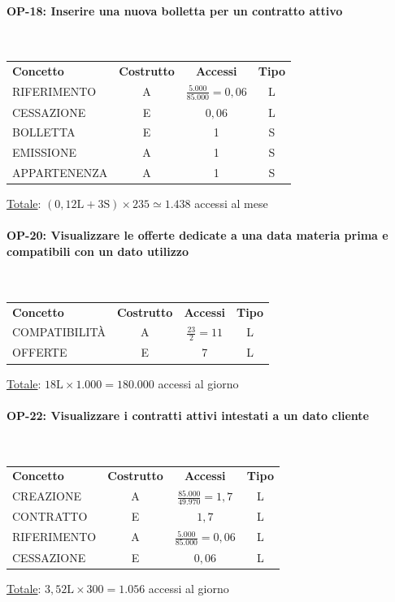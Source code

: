 \documentclass[a4paper,12pt]{report}
\begin{document}
\paragraph{OP-18: Inserire una nuova bolletta per un contratto attivo}\mbox{}\\
\begin{center}
\begin{tabular}{@{}l c  c  c@{}}
    \hline
    \textbf{Concetto} & \textbf{Costrutto} & \textbf{Accessi} & \textbf{Tipo} \\ [0.5ex]
    RIFERIMENTO & A & $\frac{5.000}{85.000} = 0,06$ & L \\
    CESSAZIONE & E & $0,06$ & L \\
    BOLLETTA & E & 1 & S \\
    EMISSIONE & A & 1 & S \\
    APPARTENENZA & A & 1 & S \\
    \hline
\end{tabular}
\end{center}
\underline{Totale}: $(0,12\text{L} + 3\text{S}) \times 235 \simeq 1.438$ accessi al mese
\paragraph{OP-20: Visualizzare le offerte dedicate a una data materia prima e compatibili con un dato utilizzo}\mbox{}\\
    \begin{center}
    \begin{tabular}{@{}l c  c  c@{}}
        \hline
        \textbf{Concetto} & \textbf{Costrutto} & \textbf{Accessi} & \textbf{Tipo} \\ [0.5ex]
        COMPATIBILITÀ & A & $\frac{23}{2} = 11$ & L \\
        OFFERTE & E & 7 & L \\
        \hline
    \end{tabular}
    \end{center}
    \underline{Totale}: $18\text{L} \times 1.000 = 180.000$ accessi al giorno
\paragraph{OP-22: Visualizzare i contratti attivi intestati a un dato cliente}\mbox{}\\
\begin{center}
\begin{tabular}{@{}l c  c  c@{}}
    \hline
    \textbf{Concetto} & \textbf{Costrutto} & \textbf{Accessi} & \textbf{Tipo} \\ [0.5ex]
    CREAZIONE & A & $\frac{85.000}{49.970} = 1,7$ & L \\
    CONTRATTO & E & $1,7$ & L \\
    RIFERIMENTO & A & $\frac{5.000}{85.000} = 0,06$ & L \\
    CESSAZIONE & E & $0,06$ & L \\
    \hline
\end{tabular}
\end{center}
\underline{Totale}: $3,52\text{L} \times 300 = 1.056$ accessi al giorno
\end{document}
